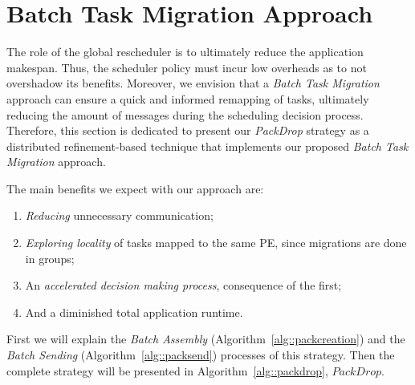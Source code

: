 \section{Batch Task Migration Approach} \label{sec:algo}



The role of the global rescheduler is to ultimately reduce the application makespan. 
Thus, the scheduler policy must incur low overheads as to not overshadow its benefits. 
Moreover, we envision that a \textit{Batch Task Migration} approach can ensure a quick and informed remapping of tasks, ultimately reducing the amount of messages during the scheduling decision process. 
Therefore, this section is dedicated to present our \textit{PackDrop} strategy as a distributed refinement-based technique that implements our proposed \textit{Batch Task Migration} approach.

The main benefits we expect with our approach are: 
\begin{enumerate}
	\item \textit{Reducing} unnecessary communication;
	\item \textit{Exploring locality} of tasks mapped to the same PE, since migrations are done in groups;
	\item An \textit{accelerated decision making process}, consequence of the first;
	\item And a diminished total application runtime.
\end{enumerate}

First we will explain the \textit{Batch Assembly} (Algorithm~\ref{alg::packcreation}) and the \textit{Batch Sending} (Algorithm~\ref{alg::packsend}) processes of this strategy.
Then the complete strategy will be presented in Algorithm~\ref{alg::packdrop}, $PackDrop$.

